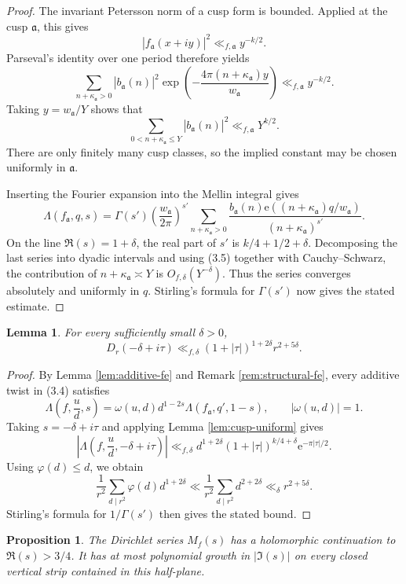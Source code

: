 \documentclass[10pt,a4paper]{amsart}
\newtheorem{lemma}[theorem]{Lemma}
\newtheorem{proposition}[theorem]{Proposition}
\newcommand{\e}{\mathrm{e}}
\begin{document}
\begin{proof}
The invariant Petersson norm of a cusp form is bounded. Applied at the cusp
$\mathfrak a$, this gives
\[
|f_{\mathfrak a}(x+iy)|^2\ll_{f,\mathfrak a}y^{-k/2}.
\]
Parseval's identity over one period therefore yields
\[
\sum_{n+\kappa_{\mathfrak a}>0}|b_{\mathfrak a}(n)|^2
\exp\left(-\frac{4\pi(n+\kappa_{\mathfrak a})y}
{w_{\mathfrak a}}\right)
\ll_{f,\mathfrak a}y^{-k/2}.
\]
Taking $y=w_{\mathfrak a}/Y$ shows that
\[
\sum_{0<n+\kappa_{\mathfrak a}\le Y}|b_{\mathfrak a}(n)|^2
\ll_{f,\mathfrak a}Y^{k/2}.
\tag{3.5}
\]
There are only finitely many cusp classes, so the implied constant may be
chosen uniformly in $\mathfrak a$.

Inserting the Fourier expansion into the Mellin integral gives
\[
\Lambda(f_{\mathfrak a},q,s)
=\Gamma(s')\left(\frac{w_{\mathfrak a}}{2\pi}\right)^{s'}
\sum_{n+\kappa_{\mathfrak a}>0}
\frac{b_{\mathfrak a}(n)
\e((n+\kappa_{\mathfrak a})q/w_{\mathfrak a})}
{(n+\kappa_{\mathfrak a})^{s'}}.
\]
On the line $\Re(s)=1+\delta$, the real part of $s'$ is
$k/4+1/2+\delta$. Decomposing the last series into dyadic intervals and
using (3.5) together with Cauchy--Schwarz, the contribution of
$n+\kappa_{\mathfrak a}\asymp Y$ is $O_{f,\delta}(Y^{-\delta})$.
Thus the series converges absolutely and uniformly in $q$. Stirling's
formula for $\Gamma(s')$ now gives the stated estimate.
\end{proof}

\begin{lemma}\label{lem:left-bound}
For every sufficiently small $\delta>0$,
\[
D_r(-\delta+i\tau)\ll_{f,\delta}(1+|\tau|)^{1+2\delta}r^{2+5\delta}.
\]
\end{lemma}

\begin{proof}
By Lemma \ref{lem:additive-fe} and Remark \ref{rem:structural-fe}, every additive twist in (3.4) satisfies
\[
\Lambda\left(f,\frac ud,s\right)
=\omega(u,d)d^{1-2s}\Lambda(f_{\mathfrak a},q',1-s),
\qquad |\omega(u,d)|=1.
\]
Taking $s=-\delta+i\tau$ and applying Lemma \ref{lem:cusp-uniform} gives
\[
\left|\Lambda\left(f,\frac ud,-\delta+i\tau\right)\right|
\ll_{f,\delta}d^{1+2\delta}(1+|\tau|)^{k/4+\delta}\e^{-\pi|\tau|/2}.
\]
Using \(\varphi(d)\leq d\), we obtain
\[
\frac1{r^2}\sum_{d\mid r^2}\varphi(d)d^{1+2\delta}
\ll
\frac1{r^2}\sum_{d\mid r^2}d^{2+2\delta}
\ll_\delta r^{2+5\delta}.
\]
Stirling's formula for \(1/\Gamma(s')\) then gives the stated bound.
\end{proof}

\begin{proposition}\label{prop:continuation}
The Dirichlet series $M_f(s)$ has a holomorphic continuation to $\Re(s)>3/4$. It has at most polynomial growth in $|\Im(s)|$ on every closed vertical strip contained in this half-plane.
\end{proposition}
\end{document}
